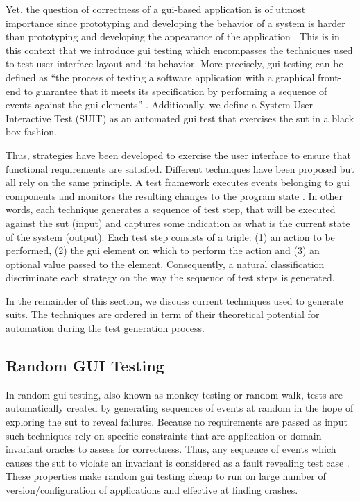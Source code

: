 Yet, the question of correctness of a \gls{gui}-based application is of utmost importance since prototyping and developing the behavior of a system is harder than prototyping and developing the appearance of the application \cite{Myers2008}. This is in this context that we introduce \gls{gui} testing which encompasses the techniques used to test user interface layout and its behavior. More precisely, \gls{gui} testing can be defined as ``the process of testing a software application with a graphical front-end to guarantee that it meets its specification by performing a sequence of events against the \gls{gui} elements'' \cite{Cunha2010, Banerjee2013, Issa2012}. Additionally, we define a System User Interactive Test (SUIT) as an automated \gls{gui} test that exercises the \gls{sut} in a black box fashion.

Thus, strategies have been developed to exercise the user interface to ensure that functional requirements are satisfied. Different techniques have been proposed but all rely on the same principle. A test framework executes events belonging to \gls{gui} components and monitors the resulting changes to the program state \cite{Nguyen2014}. In other words, each technique generates a sequence of test step, that will be executed against the \gls{sut} (input) and captures some indication as what is the current state of the system (output). Each test step consists of a triple: (1) an action to be performed, (2) the \gls{gui} element on which to perform the action and (3) an optional value passed to the element. Consequently, a natural classification discriminate each strategy on the way the sequence of test steps is generated.

In the remainder of this section, we discuss current techniques used to generate \gls{suit}s. The techniques are ordered in term of their theoretical potential for automation during the test generation process.

\subsection{Random GUI Testing}
\label{sec:introduction-random-gui-testing}

In random \gls{gui} testing, also known as monkey testing or random-walk, tests are automatically created by generating sequences of events at random in the hope of exploring the \gls{sut} to reveal failures. Because no requirements are passed as input such techniques rely on specific constraints that are application or domain invariant oracles \cite{Mesbah2009} to assess for correctness. Thus, any sequence of events which causes the \gls{sut} to violate an invariant is considered as a fault revealing test case \cite{Barr2015}. These properties make random \gls{gui} testing cheap to run on large number of version/configuration of applications and effective at finding crashes.

